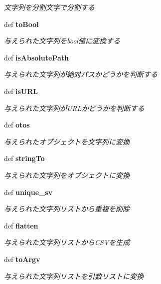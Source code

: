 \begin{CompactItemize}
\begin{CompactList}\small\item\em 文字列を分割文字で分割する \item\end{CompactList}\item 
def {\bf toBool}
\begin{CompactList}\small\item\em 与えられた文字列をbool値に変換する \item\end{CompactList}\item 
def {\bf isAbsolutePath}
\begin{CompactList}\small\item\em 与えられた文字列が絶対パスかどうかを判断する \item\end{CompactList}\item 
def {\bf isURL}
\begin{CompactList}\small\item\em 与えられた文字列がURLかどうかを判断する \item\end{CompactList}\item 
def {\bf otos}
\begin{CompactList}\small\item\em 与えられたオブジェクトを文字列に変換 \item\end{CompactList}\item 
def {\bf stringTo}
\begin{CompactList}\small\item\em 与えられた文字列をオブジェクトに変換 \item\end{CompactList}\item 
def {\bf unique\_\-sv}
\begin{CompactList}\small\item\em 与えられた文字列リストから重複を削除 \item\end{CompactList}\item 
def {\bf flatten}
\begin{CompactList}\small\item\em 与えられた文字列リストからCSVを生成 \item\end{CompactList}\item 
def {\bf toArgv}
\begin{CompactList}\small\item\em 与えられた文字列リストを引数リストに変換 \item\end{CompactList}\end{CompactItemize}


